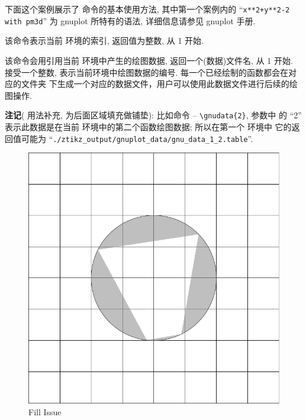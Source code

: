 \documentclass[
  hyper, lang=cn, 
  class=l3dox, 
]{../../zlatex/code/ztex}
\begin{document}
下面这个案例展示了  命令的基本使用方法, 其中第一个案例内的 ``\texttt{x**2+y**2-2 with pm3d}'' 
为 gnuplot 所特有的语法, 详细信息请参见 gnuplot 手册.



\begin{function}[added=2025-05-15]{\currentTikzIndex}
  该命令表示当前  环境的索引, 返回值为整数, 从 1 开始.
\end{function}


\begin{function}[added=2025-05-22, EXP]{\gnudata}
  \begin{syntax}
  \end{syntax}
  该命令会用引用当前  环境中产生的绘图数据, 返回一个(数据)文件名, 从 1 开始.
   接受一个整数, 表示当前环境中绘图数据的编号. 每一个已经绘制的函数都会在对应的文件夹
  下生成一个对应的数据文件，用户可以使用此数据文件进行后续的绘图操作.\par
  \textbf{注记}(\cmd{\gnudata} 用法补充, 为后面区域填充做铺垫): 比如命令 -- \verb|\gnudata{2}|, 参数中
  的 ``2'' 表示此数据是在当前  环境中的第二个函数绘图数据; 所以在第一个  环境中
  它的返回值可能为 ``\texttt{./ztikz_output/gnuplot_data/gnu_data_1_2.table}''.
\end{function}

\begin{figure}[!htb]
  \centering
  \includegraphics[width=.5\linewidth]{./support//pics/contour_data_bug.pdf}
  \caption{ Fill Issue}
  \label{fig:contour-fill-bug}
\end{figure}
\end{document}
